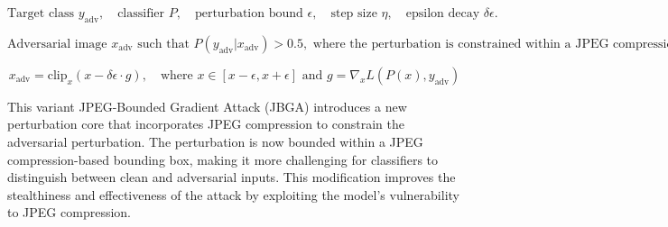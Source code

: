\[
\text{Target class } y_{\text{adv}}, \quad \text{classifier } P, \quad \text{perturbation bound } \epsilon, \quad \text{step size } \eta, \quad \text{epsilon decay } \delta \epsilon.
\]

\[
\text{Adversarial image } x_{\text{adv}} \text{ such that } P(y_{\text{adv}} | x_{\text{adv}}) > 0.5, \text{ where the perturbation is constrained within a JPEG compression-based bounding box.}
\]

\[
x_{\text{adv}} = \text{clip}_x (x - \delta \epsilon \cdot g), \quad \text{where } x \in [x - \epsilon, x + \epsilon] \text{ and } g = \nabla_x L(P(x), y_{\text{adv}})
\]

This variant JPEG-Bounded Gradient Attack (JBGA) introduces a new perturbation core that incorporates JPEG compression to constrain the adversarial perturbation. The perturbation is now bounded within a JPEG compression-based bounding box, making it more challenging for classifiers to distinguish between clean and adversarial inputs. This modification improves the stealthiness and effectiveness of the attack by exploiting the model's vulnerability to JPEG compression.
